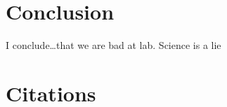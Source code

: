 \documentclass[12pt]{iopart} %
\begin{document}
\section{Conclusion}

I conclude\ldots that we are bad at lab.
Science is a lie

\section{Citations}
\end{document}
